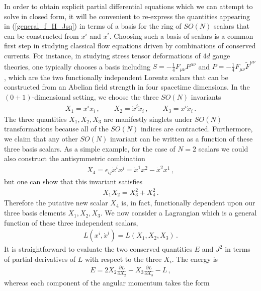 \documentclass[12pt]{article}
\numberwithin{equation}{section}
\begin{document}
In order to obtain explicit partial differential equations which we can attempt to solve in closed form, it will be convenient to re-express the quantities appearing in (\ref{general_f_H_Jsq}) in terms of a basis for the ring of $SO(N)$ scalars that can be constructed from $x^i$ and $\dot{x}^i$. Choosing such a basis of scalars is a common first step in studying classical flow equations driven by combinations of conserved currents. For instance, in studying stress tensor deformations of $4d$ gauge theories, one typically chooses a basis including $S = - \frac{1}{4} F_{\mu \nu} F^{\mu \nu}$ and $P = - \frac{1}{4} F_{\mu \nu} \widetilde{F}^{\mu \nu}$, which are the two functionally independent Lorentz scalars that can be constructed from an Abelian field strength in four spacetime dimensions. In the $(0+1)$-dimensional setting, we choose the three $SO(N)$ invariants
%
\begin{align}\label{QM_Xi_def}
    X_1 = x^i x_i \, , \qquad X_2 = \dot{x}^i \dot{x}_i \, , \qquad X_3 = x^i \dot{x}_i \, .
\end{align}
%
The three quantities $X_1, X_2, X_3$ are manifestly singlets under $SO(N)$ transformations because all of the $SO(N)$ indices are contracted. Furthermore, we claim that any other $SO(N)$ invariant can be written as a function of these three basis scalars. As a simple example, for the case of $N = 2$ scalars we could also construct the antisymmetric combination
%
\begin{align}
    X_4 = \epsilon_{ij} \dot{x}^i x^j = \dot{x}^1 x^2 - \dot{x}^2 x^1 \, , 
\end{align}
%
but one can show that this invariant satisfies
%
\begin{align}
    X_1 X_2 = X_3^2 + X_4^2 \, .
\end{align}
%
Therefore the putative new scalar $X_4$ is, in fact, functionally dependent upon our three basis elements $X_1, X_2, X_3$. We now consider a Lagrangian which is a general function of these three independent scalars,
%
\begin{align}
    L ( x^i, \dot{x}^i ) = L ( X_1, X_2, X_3 ) \, .
\end{align}
%
It is straightforward to evaluate the two conserved quantities $E$ and $J^2$ in terms of partial derivatives of $L$ with respect to the three $X_i$. The energy is
%
\begin{align}
    E = 2 X_2 \frac{\partial L}{\partial X_2} + X_3 \frac{\partial L}{\partial X_3} - L \, , 
\end{align}
%
whereas each component of the angular momentum takes the form
\end{document}
